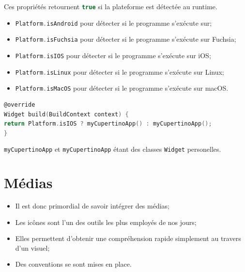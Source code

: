 \documentclass[10pt]{beamer}
\begin{document}
\begin{frame}[fragile]{\secname}
    Ces propriétés retournent \lstinline[language=c]!true! si la plateforme est détectée au runtime.
    \begin{itemize}
        \item \lstinline[language=c]!Platform.isAndroid! pour détecter si le programme s’exécute sur;
        \item \lstinline[language=c]!Platform.isFuchsia! pour détecter si le programme s’exécute sur Fuchsia;
        \item \lstinline[language=c]!Platform.isIOS! pour détecter si le programme s’exécute sur iOS;
        \item \lstinline[language=c]!Platform.isLinux! pour détecter si le programme s’exécute sur Linux;
        \item \lstinline[language=c]!Platform.isMacOS! pour détecter si le programme s’exécute sur macOS.
    \end{itemize}
\end{frame}
\begin{frame}[fragile]{\secname}
    \begin{lstlisting}[language=C]
@override
Widget build(BuildContext context) {
return Platform.isIOS ? myCupertinoApp() : myCupertinoApp();
}
    \end{lstlisting}
    \lstinline[language=c]!myCupertinoApp! et \lstinline[language=c]!myCupertinoApp! étant des classes \lstinline[language=sql]!Widget! personelles.
\end{frame}
\section{Médias}
\begin{frame}[fragile]{\secname}
    \begin{itemize}
        \item Il est donc primordial de savoir intégrer des médias;
        \item Les icônes sont l’un des outils les plus employés de nos jours;
        \item Elles permettent d’obtenir une compréhension rapide simplement au travers d’un visuel;
        \item Des conventions se sont mises en place.
    \end{itemize}
\end{frame}
\end{document}
